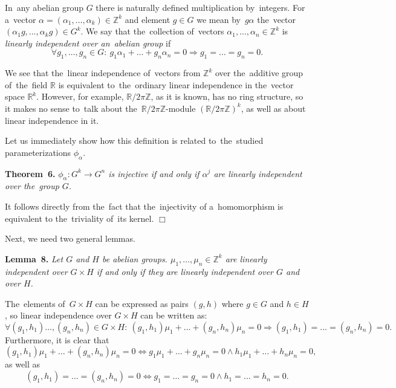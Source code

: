 \documentclass[twoside]{article}
\begin{document}
In~any abelian group $G$ there is naturally defined multiplication by~integers.
For a~vector $\alpha = (\alpha_1, \ldots, \alpha_k) \in \mathbb{Z}^k$ and element $g \in G$
we mean by~$g \alpha$ the~vector $(\alpha_1 g, \ldots, \alpha_k g) \in G^k$. We say that
the~collection of~vectors $\alpha_1, \ldots, \alpha_n \in \mathbb{Z}^k$ is \textit{linearly independent
over an~abelian group} if
$$
    \forall g_1, \ldots, g_n \in G{:}\ g_1 \alpha_1 + \ldots + g_n \alpha_n = 0 \Rightarrow g_1 = \ldots = g_n = 0.
$$

We see that the~linear independence of~vectors from $\mathbb{Z}^k$ over the~additive group of~the~field $\mathbb{R}$
is equivalent to~the~ordinary linear independence in the~vector space $\mathbb{R}^k$. However, for example,
$\mathbb{R} / 2 \pi \mathbb{Z}$, as it is known, has no ring structure, so it makes no sense
to~talk about the~$\mathbb{R} / 2 \pi \mathbb{Z}$-module $(\mathbb{R} / 2 \pi \mathbb{Z})^k$,
as well as about linear independence in it.

Let us immediately show how this definition is related to~the~studied parameterizations $\phi_\alpha$.

\medskip\noindent\textbf{Theorem~6.}\emph{
    $\phi_\alpha : G^k \rightarrow G^n$ is injective if and only if $\alpha^j$ are linearly independent over the~group $G$.
}\medskip

 It follows directly from the~fact that the~injectivity of a~homomorphism is equivalent to the~triviality of~its kernel.
\hfill$\Box$\medskip

Next, we need two general lemmas.

\medskip\noindent\textbf{Lemma~8.}\emph{
    Let $G$ and $H$ be abelian groups. $\mu_1,\allowbreak \ldots,\allowbreak \mu_n \in \mathbb{Z}^k$ are linearly independent
    over $G \times H$ if and only if they are linearly independent over $G$ and over $H$.
}\medskip

    The~elements of~$G \times H$ can be expressed as pairs $(g, h)$ where $g \in G$ and $h \in H$,
    so linear independence over $G \times H$ can be written as:
    $$
        \forall (g_1, h_1) \ldots, (g_n, h_n) \in G \times H{:}\ (g_1, h_1) \mu_1 + \ldots + (g_n, h_n) \mu_n = 0 \Rightarrow (g_1, h_1) = \ldots = (g_n, h_n) = 0.
    $$
    Furthermore, it is clear that
    $$
        (g_1, h_1) \mu_1 + \ldots + (g_n, h_n) \mu_n = 0 \Leftrightarrow g_1 \mu_1 + \ldots + g_n \mu_n = 0 \wedge h_1 \mu_1 + \ldots + h_n \mu_n = 0,
    $$
    as well as
    $$
        (g_1, h_1) = \ldots = (g_n, h_n) = 0 \Leftrightarrow g_1 = \ldots = g_n = 0 \wedge h_1 = \ldots = h_n = 0.
    $$
\end{document}
